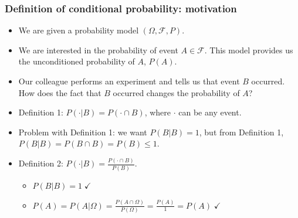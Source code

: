 \begin{frame}
    \frametitle{Definition of conditional probability: motivation}

    \begin{itemize}[<+->]
        \item We are given a probability model $(\Omega,\mathcal{F},P)$.
        \item We are interested in the probability of event $A\in\mathcal{F}$.
            This model provides us the unconditioned probability of $A$, $P(A)$.

		\item Our colleague performs an experiment and tells us that event $B$
occurred. How does the fact that $B$ occurred changes the probability of $A$?

            \begin{figure}
            \end{figure}

		\item Definition 1: $P(\cdot|B)=P(\cdot\cap B)$, where $\cdot$ can be any event.

		\item Problem with Definition 1: we want $P(B|B)=1$, but from Definition 1, $P(B|B)=P(B\cap B)=P(B)\le 1$.

		\item Definition 2: $P(\cdot|B)=\frac{P(\cdot\cap B)}{P(B)}$.

			\begin{itemize}
				\item $P(B|B)=1\;\checkmark$
				\item $P(A)=P(A|\Omega)=\frac{P(A\cap\Omega)}{P(\Omega)}=\frac{P(A)}{1}=P(A)\;\checkmark$
			\end{itemize}

    \end{itemize}

\end{frame}

